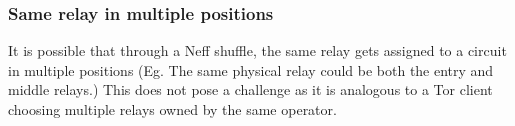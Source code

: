 {\subsubsection{Same relay in multiple positions}  It is possible that through
a Neff shuffle, the same relay gets assigned to a circuit in multiple
positions (Eg. The same physical relay could be both the entry and middle
relays.) This does not pose a challenge as it is analogous to a Tor client
choosing multiple relays owned by the same operator.








}
